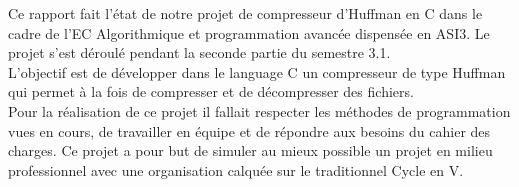 Ce rapport fait l'\'{e}tat de notre projet de compresseur d'Huffman en  C dans le cadre de l'EC Algorithmique et programmation avanc\'{e}e dispens\'{e}e en ASI3.
Le projet s'est d\'{e}roul\'{e} pendant la seconde partie du semestre 3.1.\\

L'objectif est de d\'{e}velopper dans le language C un compresseur de type Huffman qui permet à la fois de compresser et de d\'{e}compresser des fichiers.\\

Pour la r\'{e}alisation de ce projet il fallait respecter les m\'{e}thodes de programmation vues en cours, de travailler en \'{e}quipe et de r\'{e}pondre aux besoins du cahier des charges. Ce projet a pour but de simuler au mieux possible un projet en milieu professionnel avec une organisation calqu\'{e}e sur le traditionnel Cycle en V.  \\
